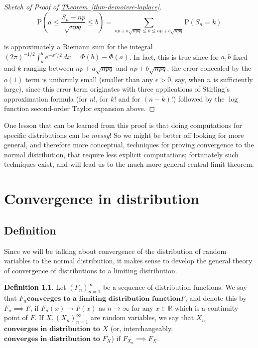 \documentclass[11pt]{report}
\newcommand{\R}{\mathbb{R}}
\theoremstyle{plain}
\theoremstyle{definition}
\newtheorem{defn}[thm]{Definition}
\begin{document}
\begin{proof}[Sketch of Proof of \texorpdfstring{\hyperref[thm-demoivre-laplace]{Theorem~\ref*{thm-demoivre-laplace}}}{Theorem}]
\[
\mathrm{P}\left(a\le \frac{S_n - np}{\sqrt{npq}} \le b\right) = \sum_{np+a\sqrt{npq}\le k\le np+b\sqrt{npq}} \mathrm{P}(S_n=k)
\]

\noindent is approximately a Riemann sum for the integral
$(2\pi)^{-1/2}\int_a^b e^{-x^2/2}\,dx =
\Phi(b)-\Phi(a)$.
In fact, this is true since for $a,b$ fixed and $k$
ranging between $np+a\sqrt{npq}$ and $np+b\sqrt{npq}$,
the error concealed by the $o(1)$ term is uniformly
small (smaller than any $\epsilon>0$, say, when $n$
is sufficiently large), since this error term
originates with three applications of Stirling's
approximation formula (for $n!$, for $k!$ and for
$(n-k)!$) followed by the $\log$ function
second-order Taylor expansion above.
\end{proof}

\noindent One lesson that can be learned from this proof is
that doing computations for specific distributions can
be \emph{messy}! So we might be better off looking for more
general, and therefore more conceptual, techniques for
proving convergence to the normal distribution, that
require less explicit computations; fortunately such
techniques exist, and will lead us to the much more
general central limit theorem.

\chapter{Convergence in distribution}

\section{Definition}

Since we will be talking about convergence of the
distribution of random variables to the normal
distribution, it makes sense to develop the general
theory of convergence of distributions to a limiting
distribution.

\begin{defn}
Let $(F_n)_{n=1}^\infty$ be a sequence of
distribution functions. We say that $F_n$$\textbf{converges to a limiting distribution
function}$$F$, and denote this by $F_n \implies F$, if
$F_n(x)\to F(x)$ as $n\to\infty$ for any $x\in\R$
which is a continuity point of $F$. If
$X, (X_n)_{n=1}^\infty$ are random variables, we say
that $X_n$$\textbf{converges in distribution to } X$
(or, interchangeably,
$\textbf{converges in distribution to } F_X$) if
$F_{X_n}\implies F_X$.
\end{defn}
\end{document}
